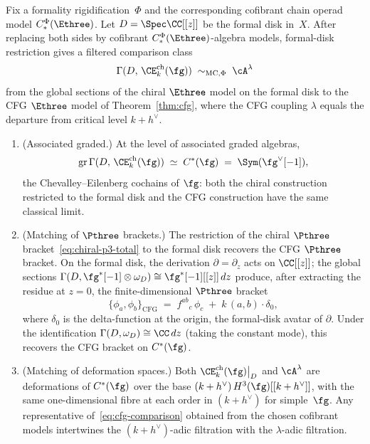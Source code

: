 \begin{theorem}
\label{thm:chiral-e3-cfg}
\ClaimStatusProvedHere
Fix a formality rigidification~$\Phi$ and the corresponding
cofibrant chain operad model $C_*^\Phi(\Ethree)$. Let
$D = \Spec \CC[[z]]$ be the formal disk in~$X$. After replacing both
sides by cofibrant $C_*^\Phi(\Ethree)$-algebra models, formal-disk
restriction gives a filtered comparison class
\begin{equation}\label{eq:cfg-comparison}
 \Gamma(D,\, \CE^{\mathrm{ch}}_k(\fg))
 \;\sim_{\mathrm{MC},\Phi}\;
 \cA^\lambda
\end{equation}
from the global sections of the chiral $\Ethree$ model
on the formal disk to the CFG $\Ethree$ model of
Theorem~\textup{\ref{thm:cfg}}, where the CFG coupling
$\lambda$ equals the departure from critical level
$k + h^\vee$.
\begin{enumerate}[label=\textup{(\roman*)}]
\item \textup{(Associated graded.)}
 At the level of associated graded algebras,
 \begin{equation}\label{eq:cfg-assoc-graded}
 \mathrm{gr}\,\Gamma(D,\, \CE^{\mathrm{ch}}_k(\fg))
 \;\simeq\;
 C^*(\fg)
 \;=\;
 \Sym(\fg^\vee[-1]),
 \end{equation}
 the Chevalley--Eilenberg cochains of $\fg$: both the
 chiral construction restricted to the formal disk and the
 CFG construction have the same classical limit.
\item \textup{(Matching of $\Pthree$ brackets.)}
 The restriction of the chiral $\Pthree$
 bracket~\eqref{eq:chiral-p3-total} to the formal disk
 recovers the CFG $\Pthree$ bracket.
 On the formal disk, the derivation $\partial = \partial_z$
 acts on $\CC[[z]]$; the global sections
 $\Gamma(D, \fg^*[-1] \otimes \omega_D)
 \cong \fg^*[-1][[z]]\,dz$ produce, after extracting the
 residue at $z = 0$, the finite-dimensional $\Pthree$
 bracket
 \[
 \{\phi_a, \phi_b\}_{\mathrm{CFG}}
 \;=\;
 f^{ab}{}_c\,\phi_c
 \;+\;
 k\,(a,b) \cdot \delta_0,
 \]
 where $\delta_0$ is the delta-function at the origin,
 the formal-disk avatar of $\partial$. Under the
 identification $\Gamma(D, \omega_D) \cong \CC\,dz$
 \textup{(}taking the constant mode\textup{)}, this
 recovers the CFG bracket on $C^*(\fg)$.
\item \textup{(Matching of deformation spaces.)}
 Both $\CE^{\mathrm{ch}}_k(\fg)\big|_D$ and
 $\cA^\lambda$ are deformations of $C^*(\fg)$ over the
 base $(k+h^\vee)\,H^3(\fg)[[k+h^\vee]]$, with the same
 one-dimensional fibre at each order in $(k+h^\vee)$ for
 simple~$\fg$.
 Any representative of~\eqref{eq:cfg-comparison} obtained from the
 chosen cofibrant models intertwines the $(k+h^\vee)$-adic
 filtration with the $\lambda$-adic filtration.
\end{enumerate}
\end{theorem}

